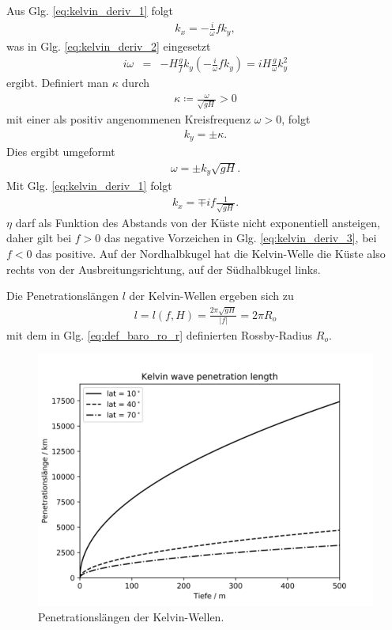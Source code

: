 \documentclass{book}
\begin{document}
%
Aus Glg. \eqref{eq:kelvin_deriv_1} folgt
%
\begin{eqnarray}
k_x = -\frac{i}{\omega}fk_y, 
\end{eqnarray}
%
was in Glg. \eqref{eq:kelvin_deriv_2} eingesetzt
%
\begin{eqnarray}
i\omega & = & -H\frac{g}{f}k_y\left(-\frac{i}{\omega}fk_y\right) = iH\frac{g}{\omega}k_y^2
\end{eqnarray}
%
ergibt. Definiert man $\kappa$ durch
%
\begin{eqnarray}
\kappa \coloneqq \frac{\omega}{\sqrt{gH}} > 0
\end{eqnarray}
%
mit einer als positiv angenommenen Kreisfrequenz $\omega > 0$, folgt
%
\begin{eqnarray}
k_y = \pm\kappa.\label{eq:kelvin_deriv_3}
\end{eqnarray}
%
Dies ergibt umgeformt
%
\begin{eqnarray}
\omega = \pm k_y\sqrt{gH}.
\end{eqnarray}
%
Mit Glg. \eqref{eq:kelvin_deriv_1} folgt
%
\begin{eqnarray}
k_x = \mp if\frac{1}{\sqrt{gH}}.
\end{eqnarray}
%
$\eta$ darf als Funktion des Abstands von der Küste nicht exponentiell ansteigen, daher gilt bei $f > 0$ das negative Vorzeichen in Glg. \eqref{eq:kelvin_deriv_3}, bei $f < 0$ das positive. Auf der Nordhalbkugel hat die Kelvin-Welle die Küste also rechts von der Ausbreitungsrichtung, auf der Südhalbkugel links.

Die Penetrationslängen $l$ der Kelvin-Wellen ergeben sich zu
%
\begin{eqnarray}
l = l\left(f, H\right) = \frac{2\pi\sqrt{gH}}{\left|f\right|} = 2\pi R_o
\end{eqnarray}
%
mit dem in Glg. \eqref{eq:def_baro_ro_r} definierten Rossby-Radius $R_o$.

\begin{figure}
\centering
\includegraphics[width = .6\textwidth]{figs/kelvin_pen.png}
\caption{Penetrationslängen der Kelvin-Wellen.}
\label{fig:kelvin_pen}
\end{figure}
\end{document}
